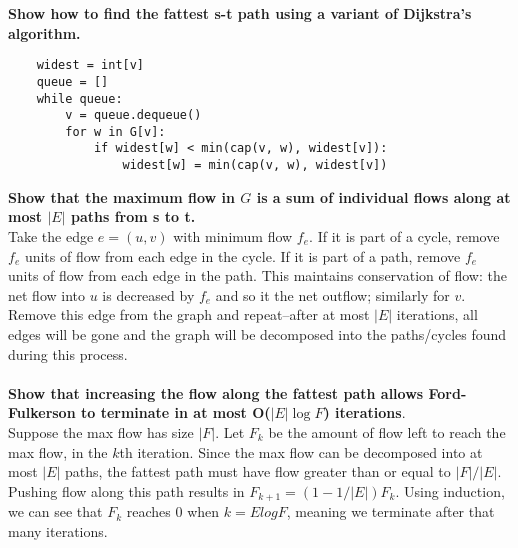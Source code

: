 \begin{problem}{7.31}
\textbf{Show how to find the fattest s-t path using a variant of Dijkstra's algorithm.}
\begin{lstlisting}
    widest = int[v]
    queue = []
    while queue:
        v = queue.dequeue()
        for w in G[v]:
            if widest[w] < min(cap(v, w), widest[v]):
                widest[w] = min(cap(v, w), widest[v])
\end{lstlisting}

\textbf{Show that the maximum flow in $G$ is a sum of individual flows along at most $|E|$ paths from s to t.} \\
Take the edge $e = (u, v)$ with minimum flow $f_e$. If it is part of a cycle, remove $f_e$ units of flow from each edge in the cycle. If it is part of a path, remove $f_e$ units of flow from each edge in the path. This maintains conservation of flow: the net flow into $u$ is decreased by $f_e$ and so it the net outflow; similarly for $v$. Remove this edge from the graph and repeat--after at most $|E|$ iterations, all edges will be gone and the graph will be decomposed into the paths/cycles found during this process. \\ \\

\textbf{Show that increasing the flow along the fattest path allows Ford-Fulkerson to terminate in at most O($|E| \log F$) iterations}. \\
Suppose the max flow has size $|F|$. Let $F_k$ be the amount of flow left to reach the max flow, in the $k$th iteration. Since the max flow can be decomposed into at most $|E|$ paths, the fattest path must have flow greater than or equal to $|F| / |E|$. Pushing flow along this path results in $F_{k + 1} = (1 - 1 / |E|)F_k$. Using induction, we can see that $F_{k}$ reaches 0 when $k = E log F$, meaning we terminate after that many iterations.
\end{problem}
